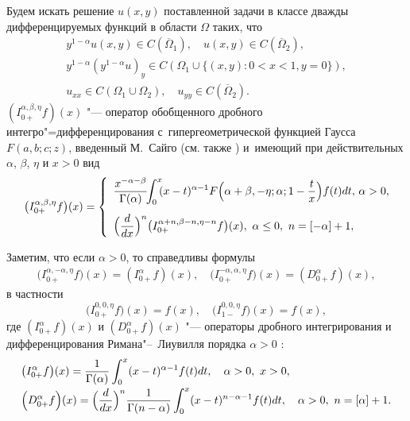 Будем искать решение $u(x,y)$ поставленной задачи в классе дважды дифференцируемых функций в области $\Omega$ таких, что
\begin{equation}
\label{taras:eq11}  
\begin{array}{l}
y^{1-\alpha} u(x,y) \in C( \overline{\Omega}_{1}), \quad u(x,y) \in C( \overline{\Omega}_{2}), \\
y^{1-\alpha} \left( y^{1-\alpha}  u \right)_{y} \in C( \Omega_{1} \cup \{ (x,y): 0<x<1, y=0 \}), \\
u_{xx} \in C(\Omega_{1} \cup \Omega_{2}), \quad u_{yy} \in C( \overline{\Omega}_{2}).
\end{array}
\end{equation}
$  (I^{ \alpha, \beta, \eta}_{0+}f)(x)$ "--- оператор обобщенного дробного интегро"=дифференцирования с~гипергеометрической функцией Гаусса $F(a, b;c;z)$, введенный М.~Сайго \cite{taras:2} (см. также \cite[с.~326--327]{taras:1}) и~имеющий при действительных $ \alpha$, $ \beta$, $ \eta$ и $x>0$ вид
\begin{equation}
\label{taras:eq3.1}
\bigl(I^{ \alpha, \beta, \eta}_{0+} f \bigr)(x)= \left\{
\begin{array}{l}
\displaystyle
\frac{x^{- \alpha - \beta}}{ \Gamma (\alpha)} \!\! \int  ^{x}_{0} \!\! (x-t)^{ \alpha -1} F \Bigl( \alpha + \beta, - \eta; \alpha; 1- \frac{t}{x}\Bigr) f(t) dt, \, \alpha >0, \\[5mm]
\displaystyle
\Bigl( \frac{d}{dx} \Bigr)^{n} \bigl(I^{ \alpha+n, \beta-n, \eta-n}_{0+} f\bigr)(x),  \ \alpha \le 0, \ n=[- \alpha]+1,
\end{array} \!\!\!\!
\right.
\end{equation}

Заметим, что если $ \alpha >0$, то справедливы формулы
\begin{equation}
\label{taras:eq4.1} {\begin{array}{l}
\bigl(I^{ \alpha, - \alpha, \eta}_{0+} f \bigr)(x)= \left(I^{ \alpha}_{0+} f \right)(x), \quad 
\bigl(I^{- \alpha, \alpha, \eta}_{0+} f \bigr)(x)= \left(D^{ \alpha}_{0+} f \right)(x),
\end{array}}
\end{equation}
в частности
\begin{equation}
\label{taras:eq5.1}
\big(I^{ 0, 0, \eta}_{0+} f \bigr)(x)= f(x), \quad \bigl(I^{ 0, 0, \eta}_{1-} f \bigr)(x)= f(x),
\end{equation}
где $\left(I^{ \alpha}_{0+} f \right)(x)$ и $\left(D^{ \alpha}_{0+} f \right)(x)$ "--- операторы дробного интегрирования и дифференцирования Римана"--~Лиувилля порядка $ \alpha>0$ \cite[с.~42, 44]{taras:1}:
\begin{equation}
\label{taras:eq6.1}  
\begin{array}{l}
\displaystyle
\bigl(I^{ \alpha}_{0+} f \bigr)(x)= \frac{1}{\Gamma (\alpha)} \int  ^{x}_{0} (x-t)^{ \alpha -1} f(t) dt, \quad \alpha >0, \ x>0, \\[3mm]
\displaystyle
\Bigl(D^{ \alpha}_{0+} f \Bigr)(x)= \Bigl(\frac{d}{dx} \Bigr)^{n} \frac{1}{\Gamma (n- \alpha)}  \int  ^{x}_{0} (x-t)^{ n-\alpha -1} f(t) dt, \quad \alpha > 0, \ n=[ \alpha]+1.
\end{array}
\end{equation}

